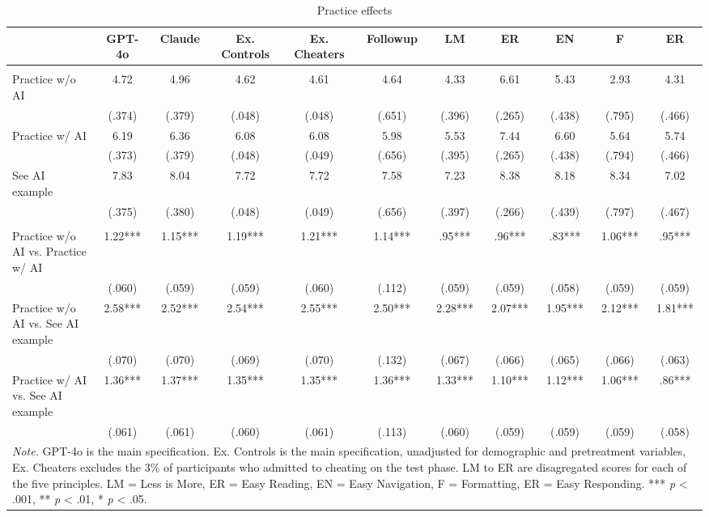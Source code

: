 \documentclass[11pt]{report}
\begin{document}
\begin{append}
\begin{table}[ht]
    \centering
    \caption{Practice effects}
   \begin{tabular}{lcccccccccc}
\toprule
  & GPT-4o & Claude & Ex. Controls & Ex. Cheaters & Followup & LM & ER & EN & F & ER \\ 
\midrule\addlinespace[2.5pt]
\multicolumn{11}{l}{\textbf{Means --- (SE)}} \\ 
\midrule\addlinespace[2.5pt]
Practice w/o AI & 4.72 & 4.96 & 4.62 & 4.61 & 4.64 & 4.33 & 6.61 & 5.43 & 2.93 & 4.31 \\ 
 & (.374) & (.379) & (.048) & (.048) & (.651) & (.396) & (.265) & (.438) & (.795) & (.466) \\ 
Practice w/ AI & 6.19 & 6.36 & 6.08 & 6.08 & 5.98 & 5.53 & 7.44 & 6.60 & 5.64 & 5.74 \\ 
 & (.373) & (.379) & (.048) & (.049) & (.656) & (.395) & (.265) & (.438) & (.794) & (.466) \\ 
See AI example & 7.83 & 8.04 & 7.72 & 7.72 & 7.58 & 7.23 & 8.38 & 8.18 & 8.34 & 7.02 \\ 
 & (.375) & (.380) & (.048) & (.049) & (.656) & (.397) & (.266) & (.439) & (.797) & (.467) \\ 
\midrule\addlinespace[2.5pt]
\multicolumn{11}{l}{\textbf{Effect Sizes (d) --- (SE)}} \\ 
\midrule\addlinespace[2.5pt]
Practice w/o AI vs. Practice w/ AI & 1.22*** & 1.15*** & 1.19*** & 1.21*** & 1.14*** & .95*** & .96*** & .83*** & 1.06*** & .95*** \\ 
 & (.060) & (.059) & (.059) & (.060) & (.112) & (.059) & (.059) & (.058) & (.059) & (.059) \\ 
Practice w/o AI vs. See AI example & 2.58*** & 2.52*** & 2.54*** & 2.55*** & 2.50*** & 2.28*** & 2.07*** & 1.95*** & 2.12*** & 1.81*** \\ 
 & (.070) & (.070) & (.069) & (.070) & (.132) & (.067) & (.066) & (.065) & (.066) & (.063) \\ 
Practice w/ AI vs. See AI example & 1.36*** & 1.37*** & 1.35*** & 1.35*** & 1.36*** & 1.33*** & 1.10*** & 1.12*** & 1.06*** & .86*** \\ 
 & (.061) & (.061) & (.060) & (.061) & (.113) & (.060) & (.059) & (.059) & (.059) & (.058) \\ 
\midrule
\multicolumn{11}{p{18cm}}{\textit{Note.} GPT-4o is the main specification. Ex. Controls is the main specification, unadjusted for demographic and pretreatment variables, Ex. Cheaters excludes the 3\% of participants who admitted to cheating on the test phase. LM to ER are disagregated scores for each of the five principles. LM = Less is More, ER = Easy Reading, EN = Easy Navigation, F = Formatting, ER = Easy Responding. *** \textit{p} < .001, ** \textit{p} < .01, * \textit{p} < .05.}
\vspace{5pt}
\end{tabular}
    \label{tab:s3_practice}
\end{table}



\end{append}
\end{document}
